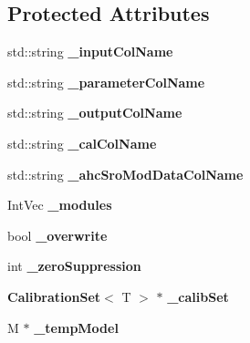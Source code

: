 \subsection*{Protected Attributes}
\begin{DoxyCompactItemize}
\item 
std\-::string {\bfseries \-\_\-input\-Col\-Name}\label{classCALICE_1_1FastCalib2DProcessor_ad2a51e143d704ff9d9d33d155381fa2b}

\item 
std\-::string {\bfseries \-\_\-parameter\-Col\-Name}\label{classCALICE_1_1FastCalib2DProcessor_aeeddf47e62b3ffa578893b3e040a46c9}

\item 
std\-::string {\bfseries \-\_\-output\-Col\-Name}\label{classCALICE_1_1FastCalib2DProcessor_a67e450d381f338c512bfb61950adc5d8}

\item 
std\-::string {\bfseries \-\_\-cal\-Col\-Name}\label{classCALICE_1_1FastCalib2DProcessor_acea129179d4f2e8c00901817a63448ab}

\item 
std\-::string {\bfseries \-\_\-ahc\-Sro\-Mod\-Data\-Col\-Name}\label{classCALICE_1_1FastCalib2DProcessor_aa1d4ac2e926484e24dd1dbdaf72ea2d5}

\item 
Int\-Vec {\bfseries \-\_\-modules}\label{classCALICE_1_1FastCalib2DProcessor_a510d4c71eeac41329b513092d81f37e4}

\item 
bool {\bfseries \-\_\-overwrite}\label{classCALICE_1_1FastCalib2DProcessor_ad4f708e7935bc324ce4df8a2ab97cae2}

\item 
int {\bfseries \-\_\-zero\-Suppression}\label{classCALICE_1_1FastCalib2DProcessor_a3ced223e8bc88a1530a2edd1a2336b5e}

\item 
{\bf Calibration\-Set}$<$ T $>$ $\ast$ {\bfseries \-\_\-calib\-Set}\label{classCALICE_1_1FastCalib2DProcessor_a8bc3270235a8c869a5b8d72d74709bce}

\item 
M $\ast$ {\bfseries \-\_\-temp\-Model}\label{classCALICE_1_1FastCalib2DProcessor_a12febd0f31953e9426311be25b2a4aaa}

\end{DoxyCompactItemize}
